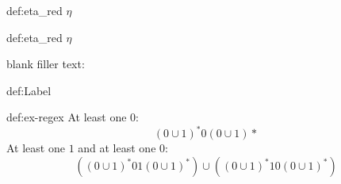 \documentclass[landscape, 8pt]{extarticle}
\begin{document}
\begin{multicols}{3}
\begin{dfn}{def:eta_red}{}
$\eta$    
\end{dfn}

\begin{dfn}{def:eta_red}{}
$\eta$    
\end{dfn}




blank filler text: \lipsum[1-12]



\begin{dfn}[Name]{def:Label}{}

\end{dfn}


\newpage
\begin{xmp}{def:ex-regex}{}
At least one $0$:
\[(0\cup 1) ^{*} 0(0\cup 1)*\]
At least one $1$ and at least one $0$:
\[((0 \cup 1)^*01(0 \cup 1)^*) \cup ((0 \cup 1)^*10(0 \cup 1)^*)\]
\end{xmp}






\end{multicols}
\end{document}
